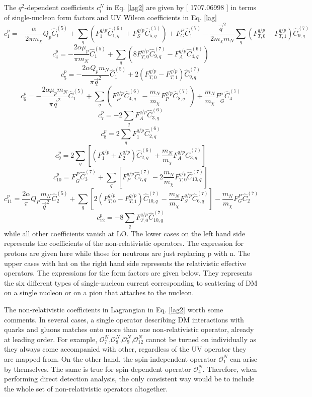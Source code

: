 \documentclass[12pt]{article}
\begin{document}
The $q^2$-dependent coefficients $c_i^N$ in Eq. \ref{lag2} are given by [ 1707.06998 ] in terms of single-nucleon form factors and UV Wilson coefficients in Eq. \ref{lag}
$$
c_1^p = - \frac {\alpha} {2 \pi m_\chi } Q_p \hat C_1^{(5)} + \sum_q ( F_1^{q/p} \hat C_{1,q}^{(6)} + F_S^{q/p} \hat C_{5,q}^{(7)} ) + F_G^P \hat C_1^{(7)} - \frac { \vec q^2}{2 m_\chi m_N } \sum_q (F_{T,0}^{q/p} - F_{T,1}^{q/p} ) \hat C_{9,q}^{(7)}
$$
$$
c_4^p = - \frac {2\alpha \mu_p } { \pi m_N }  \hat C_1^{(5)} + \sum_q ( 8 F_{T,0}^{q/p} \hat C_{9,q}^{(7)} - F_A^{q/p} \hat C_{4,q}^{(6)} ) 
$$
$$
c_5^p = - \frac {2\alpha  Q_p m_N} { \pi \vec q^2 } \hat C_1^{(5)} + 2 (  F_{T,0}^{q/p} - F_{T,1}^{q/p} )\hat C_{9,q}^{(7)} 
$$
$$
c_6^p = - \frac {2\alpha \mu_p m_N } { \pi \vec q^2 }  \hat C_1^{(5)} + \sum_q (  F_{P'}^{q/p} \hat C_{4,q}^{(6)} - \frac{m_N}{m_\chi} F_P^{q/p} \hat C_{8,q}^{(7)} ) + \frac{m_N}{m_\chi} F_{\tilde G}^p \hat C_4^{(7)}
$$
$$
c_7^p = - 2 \sum    _q F_A^{q/p} \hat C_{3,q}^{(6)} 
$$
$$
c_8^p = 2 \sum_q F_1^{q/p} \hat C_{2,q}^{(6)} 
$$
$$
c_9^p = 2 \sum_q [ ( F_1^{q/p} + F_2^{q/p}  ) \hat C_{2,q}^{(6)}  +  \frac{m_N}{m_\chi} F_A^{q/p} \hat C^{(7)}_{3,q} ]
$$
$$
c_{10}^p = F_{\tilde G}^P \hat C_3^{(7)} +  \sum_q [ F_P ^{q/p} \hat C_{7,q}^{(7)}  - 2 \frac{m_N}{m_\chi} F_{T,0}^{q/p} \hat C_{10,q}^{(7)} ]
$$
$$
c_{11}^p = \frac{2\alpha}{\pi} Q_P \frac{m_N}{\vec q ^2 } \hat C_2^{(5)} + \sum_q [ 2 (F_{T,0}^{q/p} - F_{T,1}^{q/p} ) \hat C_{10,q}^{(7)} -\frac{m_N}{m_\chi} F_S^{q/p} \hat C_{6,q}^{(7)} ] - \frac{m_N}{m_\chi} F_G^P \hat C_2^{(7)}
$$
$$
c_{12}^p = -8 \sum_q F_{T,0}^{q/p} \hat C_{10,q}^{(7)}
$$
while all other coefficients vanish at LO. The lower cases on the left hand side represents the coefficients of the non-relativistic operators. The expression for protons are given here while those for neutrons are just replacing p with n. The upper cases with hat on the right hand side represents the relativistic effective operators. The expressions for the form factors are given below. They represents the six different types of single-nucleon current corresponding to scattering of DM on a single nucleon or on a pion that attaches to the nucleon. 

The non-relativistic coefficients in Lagrangian in Eq. \ref{lag2} worth some comments. In several cases, a single operator describing DM interactions with quarks and gluons matches onto more than one non-relativistic operator, already at leading order. For example, $\mathcal O_7^N$,$\mathcal O_8^N$,$\mathcal O_9^N$,$\mathcal O_{12}^N$ cannot be turned on individually as they always come accompanied with other, regardless of the UV operator they are mapped from. On the other hand, the spin-independent operator $\mathcal O_1^N$ can arise by themselves. The same is true for spin-dependent operator $\mathcal O_4^N$. Therefore, when performing direct detection analysis, the only consistent way would be to include the whole set of non-relativistic operators altogether. 
\end{document}
